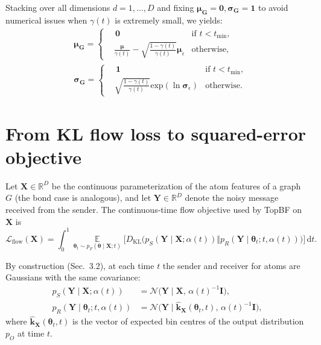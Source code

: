 \documentclass[journal,twoside,web]{ieeecolor}
\begin{document}
Stacking over all dimensions $d=1,\dots,D$ and fixing $\boldsymbol{\mu}_\mathbf{G} = \mathbf{0}, \boldsymbol{\sigma}_\mathbf{G} = \mathbf{1}$ to avoid numerical issues when $\gamma(t)$ is extremely small, we yields:
\begin{equation}
    \begin{aligned}
        & \boldsymbol{\mu}_\mathbf{G} = \left\{
    \begin{aligned}
        & \, \boldsymbol{0} & \text{if $t<t_{\text{min}}$},\\
        & \frac{\boldsymbol{\mu}}{\gamma(t)} - \sqrt{\frac{1-\gamma(t)}{\gamma(t)}}\boldsymbol{\mu}_\epsilon & \text{otherwise,}
    \end{aligned}
    \right. \\
    & \boldsymbol{\sigma}_\mathbf{G} = \left\{
    \begin{aligned}
        & \, \boldsymbol{1} & \text{if $t<t_{\text{min}}$},\\
        & \sqrt{\frac{1-\gamma(t)}{\gamma(t)}}\text{exp}(\ln\boldsymbol{\sigma}_\epsilon) & \text{otherwise.}
    \end{aligned}
    \right.
    \end{aligned}
\end{equation}



\section{From KL flow loss to squared-error objective}
\label{app:loss}

Let $\mathbf{X}\in\mathbb{R}^{D}$ be the continuous parameterization of the atom features of a graph $G$
(the bond case is analogous), and let $\mathbf{Y}\in\mathbb{R}^{D}$ denote the noisy message received
from the sender. The continuous-time flow objective used by TopBF on $\mathbf{X}$ is
\begin{equation}
\mathcal{L}_{\text{flow}}(\mathbf{X})
=
\int_0^1 
\mathop{\mathbb{E}}\limits_{\boldsymbol{\theta}_t \sim p_F(\boldsymbol{\theta}\mid \mathbf{X};t)} \Big[ D_{\mathrm{KL}}\big( p_S(\mathbf{Y} \mid \mathbf{X};\alpha(t))
\Vert
p_R(\mathbf{Y} \mid \boldsymbol{\theta}_t; t,\alpha(t)) \big) \Big] \,\mathrm{d}t.
\label{eq:cts-flow-kl}
\end{equation}

By construction (Sec.~3.2), at each time $t$ the sender and receiver for atoms are Gaussians with the
same covariance:
\begin{align}
p_S(\mathbf{Y} \mid \mathbf{X};\alpha(t))
&=
\mathcal{N}\big(\mathbf{Y} \mid \mathbf{X},\,\alpha(t)^{-1}\mathbf{I}\big), \\
p_R(\mathbf{Y} \mid \boldsymbol{\theta}_t; t,\alpha(t))
&=
\mathcal{N}\big(\mathbf{Y} \mid \hat{\mathbf{k}}_{\mathbf{X}}(\boldsymbol{\theta}_t,t),\,\alpha(t)^{-1}\mathbf{I}\big),
\end{align}
where $\hat{\mathbf{k}}_{\mathbf{X}}(\boldsymbol{\theta}_t,t)$ is the vector of expected bin centres of
the output distribution $p_O$ at time $t$.
\end{document}
